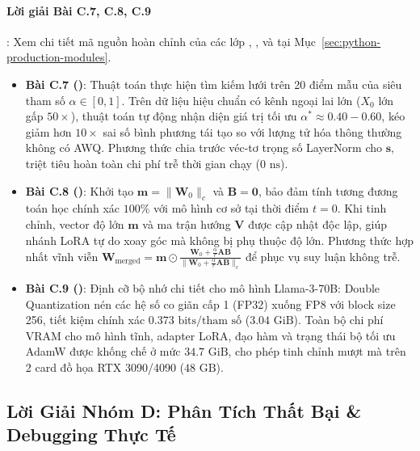 \paragraph{Lời giải Bài C.7, C.8, C.9}:
Xem chi tiết mã nguồn hoàn chỉnh của các lớp , , và  tại Mục~\ref{sec:python-production-modules}.
\begin{itemize}
  \item \textbf{Bài C.7 ()}:
  Thuật toán thực hiện tìm kiếm lưới trên 20 điểm mẫu của siêu tham số $\alpha \in [0, 1]$. Trên dữ liệu hiệu chuẩn có kênh ngoại lai lớn ($X_0$ lớn gấp $50\times$), thuật toán tự động nhận diện giá trị tối ưu $\alpha^* \approx 0.40 - 0.60$, kéo giảm hơn $10\times$ sai số bình phương tái tạo so với lượng tử hóa thông thường không có AWQ. Phương thức  chia trước véc-tơ trọng số LayerNorm cho $\mathbf{s}$, triệt tiêu hoàn toàn chi phí trễ thời gian chạy ($0\text{ ns}$).
  \item \textbf{Bài C.8 ()}:
  Khởi tạo $\mathbf{m} = \|\mathbf{W}_0\|_c$ và $\mathbf{B} = \mathbf{0}$, bảo đảm tính tương đương toán học chính xác $100\%$ với mô hình cơ sở tại thời điểm $t=0$. Khi tinh chỉnh, vector độ lớn $\mathbf{m}$ và ma trận hướng $\mathbf{V}$ được cập nhật độc lập, giúp nhánh LoRA tự do xoay góc mà không bị phụ thuộc độ lớn. Phương thức  hợp nhất vĩnh viễn $\mathbf{W}_{\text{merged}} = \mathbf{m} \odot \frac{\mathbf{W}_0 + \frac{\alpha}{r}\mathbf{A}\mathbf{B}}{\|\mathbf{W}_0 + \frac{\alpha}{r}\mathbf{A}\mathbf{B}\|_c}$ để phục vụ suy luận không trễ.
  \item \textbf{Bài C.9 ()}:
  Định cỡ bộ nhớ chi tiết cho mô hình Llama-3-70B: Double Quantization nén các hệ số co giãn cấp 1 (FP32) xuống FP8 với block size 256, tiết kiệm chính xác $0.373\text{ bits/tham số}$ ($3.04\text{ GiB}$). Toàn bộ chi phí VRAM cho mô hình tĩnh, adapter LoRA, đạo hàm và trạng thái bộ tối ưu AdamW được khống chế ở mức $34.7\text{ GiB}$, cho phép tinh chỉnh mượt mà trên 2 card đồ họa RTX 3090/4090 ($48\text{ GB}$).
\end{itemize}

\subsection{Lời Giải Nhóm D: Phân Tích Thất Bại \& Debugging Thực Tế}

